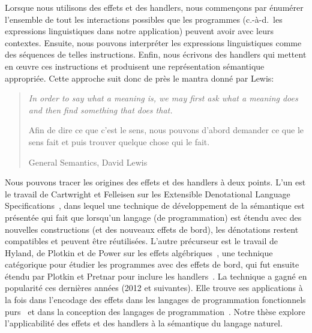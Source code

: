Lorsque nous utilisons des effets et des handlers, nous commençons par énumérer
l'ensemble de tout les interactions possibles que les programmes (c.-à-d.\ les
expressions linguistiques dans notre application) peuvent avoir avec leurs
contextes. Ensuite, nous pouvons interpréter les expressions linguistiques comme
des séquences de telles instructions. Enfin, nous écrivons des handlers qui
mettent en œuvre ces instructions et produisent une représentation sémantique
appropriée. Cette approche suit donc de près le mantra donné par Lewis:

\begin{quote}
  \begin{english}
    \textit{In order to say what a meaning is, we may first ask what a meaning
      does and then find something that does that.}
  \end{english}

  Afin de dire ce que c'est le sens, nous pouvons d'abord demander ce que le
  sens fait et puis trouver quelque chose qui le fait.

  \begin{flushright}
    General Semantics, David Lewis~\cite{lewis1970general}
  \end{flushright}
\end{quote}

Nous pouvons tracer les origines des effets et des handlers à deux points. L'un
est le travail de Cartwright et Felleisen sur les Extensible Denotational
Language Specifications~\cite{cartwright1994extensible}, dans lequel une
technique de développement de la sémantique est présentée qui fait que lorsqu'un
langage (de programmation) est étendu avec des nouvelles constructions (et des
nouveaux effets de bord), les dénotations restent compatibles et peuvent être
réutilisées. L'autre précurseur est le travail de Hyland, de Plotkin et de Power
sur les effets algébriques~\cite{hyland2006combining}, une technique catégorique
pour étudier les programmes avec des effets de bord, qui fut ensuite étendu par
Plotkin et Pretnar pour inclure les
handlers~\cite{plotkin2009handlers,pretnar2010logic,plotkin2013handling}. La
technique a gagné en popularité ces dernières années (2012 et suivantes). Elle
trouve ses applications à la fois dans l'encodage des effets dans les langages
de programmation fonctionnels
purs~\cite{kiselyov2013extensible,kiselyov2015freer,kammar2013handlers,brady2013programming}
et dans la conception des langages de
programmation~\cite{bauer2012programming,lindley2016dobedobedo,dolan2015effective,kiselyov2016eff,hillerstrom2016compiling}.
Notre thèse explore l'applicabilité des effets et des handlers à la sémantique
du langage naturel.


